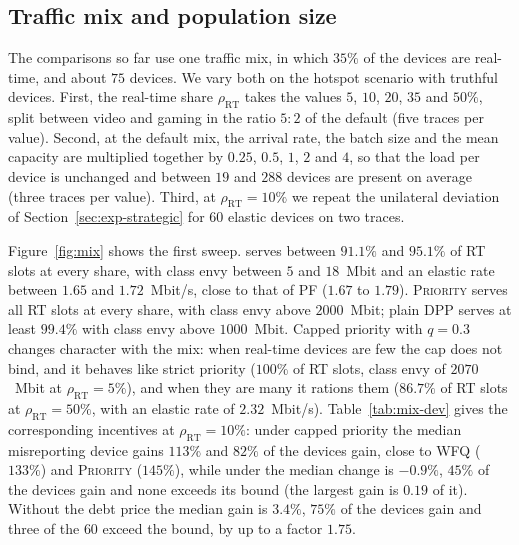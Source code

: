 \begin{table}[t]
\centering
\caption{Oracle slot-switching attack against \repay{} ($120$ devices on six traces): change in volume relative to truthful declaration.}
\label{tab:oracle}
\resizebox{\linewidth}{!}{}
\end{table}

\begin{table}[t]
\centering
\caption{Oracle attack ($40$ devices on two traces) against \repay{}, against a variant in which deficits are kept frozen while a device declares video, and against that variant with incumbents-first admission.}
\label{tab:ablation}
\resizebox{\linewidth}{!}{}
\end{table}

\subsection{Traffic mix and population size}\label{sec:exp-mix}

The comparisons so far use one traffic mix, in which $35\%$ of the devices are real-time, and about $75$ devices.
We vary both on the hotspot scenario with truthful devices.
First, the real-time share $\rho_{\mathrm{RT}}$ takes the values $5$, $10$, $20$, $35$ and $50\%$, split between video and gaming in the ratio $5:2$ of the default (five traces per value).
Second, at the default mix, the arrival rate, the batch size and the mean capacity are multiplied together by $0.25$, $0.5$, $1$, $2$ and $4$, so that the load per device is unchanged and between $19$ and $288$ devices are present on average (three traces per value).
Third, at $\rho_{\mathrm{RT}}=10\%$ we repeat the unilateral deviation of Section~\ref{sec:exp-strategic} for $60$ elastic devices on two traces.

Figure~\ref{fig:mix} shows the first sweep.
\repay{} serves between $91.1\%$ and $95.1\%$ of RT slots at every share, with class envy between $5$ and $18$~Mbit and an elastic rate between $1.65$ and $1.72$~Mbit/s, close to that of \textsc{PF} ($1.67$ to $1.79$).
\textsc{Priority} serves all RT slots at every share, with class envy above $2000$~Mbit; plain DPP serves at least $99.4\%$ with class envy above $1000$~Mbit.
Capped priority with $q=0.3$ changes character with the mix: when real-time devices are few the cap does not bind, and it behaves like strict priority ($100\%$ of RT slots, class envy of $2070$~Mbit at $\rho_{\mathrm{RT}}=5\%$), and when they are many it rations them ($86.7\%$ of RT slots at $\rho_{\mathrm{RT}}=50\%$, with an elastic rate of $2.32$~Mbit/s).
Table~\ref{tab:mix-dev} gives the corresponding incentives at $\rho_{\mathrm{RT}}=10\%$: under capped priority the median misreporting device gains $113\%$ and $82\%$ of the devices gain, close to \textsc{WFQ} ($133\%$) and \textsc{Priority} ($145\%$), while under \repay{} the median change is $-0.9\%$, $45\%$ of the devices gain and none exceeds its bound (the largest gain is $0.19$ of it).
Without the debt price the median gain is $3.4\%$, $75\%$ of the devices gain and three of the $60$ exceed the bound, by up to a factor $1.75$.

